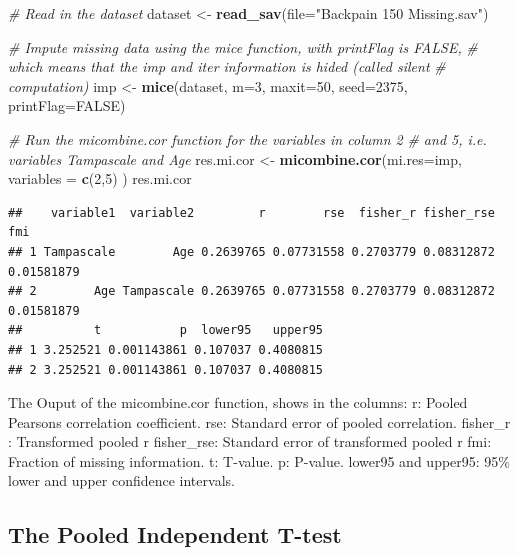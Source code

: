 \documentclass[
]{book}
\newenvironment{Shaded}{\begin{snugshade}}{\end{snugshade}}
\newcommand{\CommentTok}[1]{\textcolor[rgb]{0.56,0.35,0.01}{\textit{#1}}}
\newcommand{\DataTypeTok}[1]{\textcolor[rgb]{0.13,0.29,0.53}{#1}}
\newcommand{\DecValTok}[1]{\textcolor[rgb]{0.00,0.00,0.81}{#1}}
\newcommand{\KeywordTok}[1]{\textcolor[rgb]{0.13,0.29,0.53}{\textbf{#1}}}
\newcommand{\NormalTok}[1]{#1}
\newcommand{\OtherTok}[1]{\textcolor[rgb]{0.56,0.35,0.01}{#1}}
\newcommand{\StringTok}[1]{\textcolor[rgb]{0.31,0.60,0.02}{#1}}
\begin{document}
\begin{Shaded}
\begin{Highlighting}[]
\CommentTok{# Read in the dataset }
\NormalTok{dataset <-}\StringTok{ }\KeywordTok{read_sav}\NormalTok{(}\DataTypeTok{file=}\StringTok{"Backpain 150 Missing.sav"}\NormalTok{)}

\CommentTok{# Impute missing data using the mice function, with printFlag is FALSE, }
\CommentTok{# which means that the imp and iter information is hided (called silent }
\CommentTok{# computation)}
\NormalTok{imp <-}\StringTok{ }\KeywordTok{mice}\NormalTok{(dataset, }\DataTypeTok{m=}\DecValTok{3}\NormalTok{, }\DataTypeTok{maxit=}\DecValTok{50}\NormalTok{, }\DataTypeTok{seed=}\DecValTok{2375}\NormalTok{, }\DataTypeTok{printFlag=}\OtherTok{FALSE}\NormalTok{)}

\CommentTok{# Run the micombine.cor function for the variables in column 2 }
\CommentTok{# and 5, i.e. variables Tampascale and Age}
\NormalTok{res.mi.cor <-}\StringTok{ }\KeywordTok{micombine.cor}\NormalTok{(}\DataTypeTok{mi.res=}\NormalTok{imp, }\DataTypeTok{variables =} \KeywordTok{c}\NormalTok{(}\DecValTok{2}\NormalTok{,}\DecValTok{5}\NormalTok{) )}
\NormalTok{res.mi.cor}
\end{Highlighting}
\end{Shaded}

\begin{verbatim}
##    variable1  variable2         r        rse  fisher_r fisher_rse        fmi
## 1 Tampascale        Age 0.2639765 0.07731558 0.2703779 0.08312872 0.01581879
## 2        Age Tampascale 0.2639765 0.07731558 0.2703779 0.08312872 0.01581879
##          t           p  lower95   upper95
## 1 3.252521 0.001143861 0.107037 0.4080815
## 2 3.252521 0.001143861 0.107037 0.4080815
\end{verbatim}

The Ouput of the micombine.cor function, shows in the columns:
r: Pooled Pearsons correlation coefficient.
rse: Standard error of pooled correlation.
fisher\_r : Transformed pooled r
fisher\_rse: Standard error of transformed pooled r
fmi: Fraction of missing information.
t: T-value.
p: P-value.
lower95 and upper95: 95\% lower and upper confidence intervals.

\hypertarget{the-pooled-independent-t-test}{%
\subsection{The Pooled Independent T-test}\label{the-pooled-independent-t-test}}
\end{document}
